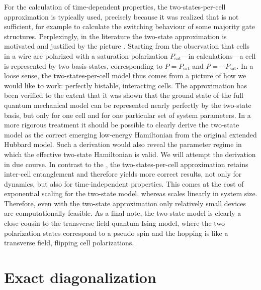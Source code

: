 For the calculation of time-dependent properties, the two-states-per-cell
approximation is typically used, precisely because it was realized that
 is not sufficient, for example to calculate the switching behaviour
of some majority gate structures. Perplexingly, in the literature the two-state
approximation is motivated and justified by the  picture
\cite{tougaw1996dynamic}. Starting from the observation that cells in a wire are
polarized with a saturation polarization $P_{\textrm{sat}}$---in 
calculations---a cell is represented by two basis states, corresponding to $P =
P_{\textrm{sat}}$ and $P = - P_{\textrm{sat}}$. In a loose sense, the
two-states-per-cell model thus comes from a picture of how we would like
 to work: perfectly bistable, interacting cells. The approximation
has been verified to the extent that it was shown that the ground state of the
full quantum mechanical model can be represented nearly perfectly by the
two-state basis, but only for one cell and for one particular set of system
parameters. In a more rigorous treatment it should be possible to clearly derive
the two-state model as the correct emerging low-energy Hamiltonian from the
original extended Hubbard model. Such a derivation would also reveal the
parameter regime in which the effective two-state Hamiltonian is valid. We will
attempt the derivation in due course. In contrast to the , the
two-states-per-cell approximation retains inter-cell entanglement and therefore
yields more correct results, not only for dynamics, but also for
time-independent properties. This comes at the cost of exponential scaling for
the two-state model, whereas  scales linearly in system size.
Therefore, even with the two-state approximation only relatively small
 devices are computationally feasible. As a final note, the two-state
model is clearly a close cousin to the transverse field quantum Ising model,
where the two polarization states correspond to a pseudo spin and the hopping is
like a transverse field, flipping cell polarizations.


\section{Exact diagonalization}

